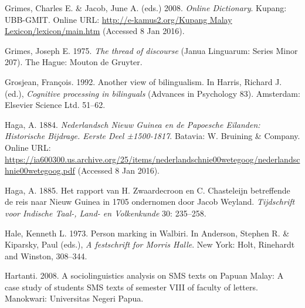 \begin{styleCitaviBibliographyEntry}
Grimes, Charles E. \& Jacob, June A. (eds.) 2008. \textit{ Online Dictionary}. Kupang: UBB-GMIT. Online URL: \href{http://e-kamus2.org/Kupang Malay Lexicon/lexicon/main.htm}{http://e-kamus2.org/Kupang Malay Lexicon/lexicon/main.htm} (Accessed 8 Jan 2016).
\end{styleCitaviBibliographyEntry}

\begin{styleCitaviBibliographyEntry}
Grimes, Joseph E. 1975. \textit{The thread of discourse} (Janua Linguarum: Series Minor 207). The Hague: Mouton de Gruyter.
\end{styleCitaviBibliographyEntry}

\begin{styleCitaviBibliographyEntry}
Grosjean, François. 1992. Another view of bilingualism. In Harris, Richard J. (ed.), \textit{Cognitive processing in bilinguals} (Advances in Psychology 83). Amsterdam: Elsevier Science Ltd. 51–62.
\end{styleCitaviBibliographyEntry}

\begin{styleCitaviBibliographyEntry}
Haga, A. 1884. \textit{Nederlandsch Nieuw Guinea en de Papoesche Eilanden: Historische Bijdrage. Eerste Deel ±1500-1817}. Batavia: W. Bruining \& Company. Online URL: \url{https://ia600300.us.archive.org/25/items/nederlandschnie00wetegoog/nederlandschnie00wetegoog.pdf} (Accessed 8 Jan 2016).
\end{styleCitaviBibliographyEntry}

\begin{styleCitaviBibliographyEntry}
Haga, A. 1885. Het rapport van H. Zwaardecroon en C. Chasteleijn betreffende de reis naar Nieuw Guinea in 1705 ondernomen door Jacob Weyland. \textit{Tijdschrift voor Indische Taal-, Land- en Volkenkunde} 30: 235–258.
\end{styleCitaviBibliographyEntry}

\begin{styleCitaviBibliographyEntry}
Hale, Kenneth L. 1973. Person marking in Walbiri. In Anderson, Stephen R. \& Kiparsky, Paul (eds.), \textit{A festschrift for Morris Halle}. New York: Holt, Rinehardt and Winston, 308–344.
\end{styleCitaviBibliographyEntry}

\begin{styleCitaviBibliographyEntry}
Hartanti. 2008. A sociolinguistics analysis on SMS texts on Papuan Malay: A case study of students SMS texts of semester VIII of faculty of letters. Manokwari: Universitas Negeri Papua.
\end{styleCitaviBibliographyEntry}

